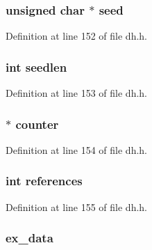 \subsubsection[{\texorpdfstring{seed}{seed}}]{\setlength{\rightskip}{0pt plus 5cm}unsigned char $\ast$ seed}\hypertarget{structdh__st_aa2210dcd1c7bdfbd000f6a966adf86e8}{}\label{structdh__st_aa2210dcd1c7bdfbd000f6a966adf86e8}


Definition at line 152 of file dh.\+h.

\subsubsection[{\texorpdfstring{seedlen}{seedlen}}]{\setlength{\rightskip}{0pt plus 5cm}int seedlen}\hypertarget{structdh__st_a8cae5e0a501d982b308a11163ac91a34}{}\label{structdh__st_a8cae5e0a501d982b308a11163ac91a34}


Definition at line 153 of file dh.\+h.

\subsubsection[{\texorpdfstring{counter}{counter}}]{ $\ast$ counter}\hypertarget{structdh__st_a1cf37e48d92f3521fcb5f681b749bea0}{}\label{structdh__st_a1cf37e48d92f3521fcb5f681b749bea0}


Definition at line 154 of file dh.\+h.

\subsubsection[{\texorpdfstring{references}{references}}]{\setlength{\rightskip}{0pt plus 5cm}int references}\hypertarget{structdh__st_a146fdb34d9a909e530adf8b189481195}{}\label{structdh__st_a146fdb34d9a909e530adf8b189481195}


Definition at line 155 of file dh.\+h.

\subsubsection[{\texorpdfstring{ex\+\_\+data}{ex_data}}]{ ex\+\_\+data}\hypertarget{structdh__st_ac3e4fd59d6ee44a81f3a58114613c1e2}{}\label{structdh__st_ac3e4fd59d6ee44a81f3a58114613c1e2}


